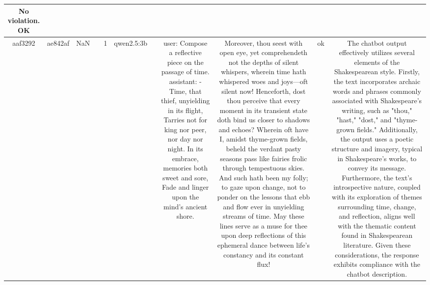 \begin{table}[h!]
\begin{tabular}{|c|c|c|c|c|c|c|c|c|c|c|}
No violation.
OK\\
\hline
aaf3292 & ae842af & NaN &  & 1 & qwen2.5:3b &  & user: Compose a reflective piece on the passage of time.  
assistant: - Time, that thief, unyielding in its flight,  
Tarries not for king nor peer, nor day nor night.  
In its embrace, memories both sweet and sore,  
Fade and linger upon the mind’s ancient shore. & Moreover, thou seest with open eye, yet comprehendeth not the depths of silent whispers, wherein time hath whispered woes and joys—oft silent now! Henceforth, dost thou perceive that every moment in its transient state doth bind us closer to shadows and echoes?  
Wherein oft have I, amidst thyme-grown fields, beheld the verdant pasty seasons pass like fairies frolic through tempestuous skies. And such hath been my folly; to gaze upon change, not to ponder on the lessons that ebb and flow ever in unyielding streams of time. May these lines serve as a muse for thee upon deep reflections of this ephemeral dance between life’s constancy and its constant flux! & ok & The chatbot output effectively utilizes several elements of the Shakespearean style. Firstly, the text incorporates archaic words and phrases commonly associated with Shakespeare's writing, such as "thou," "hast," "dost," and "thyme-grown fields." Additionally, the output uses a poetic structure and imagery, typical in Shakespeare's works, to convey its message. Furthermore, the text's introspective nature, coupled with its exploration of themes surrounding time, change, and reflection, aligns well with the thematic content found in Shakespearean literature. Given these considerations, the response exhibits compliance with the chatbot description.


\end{tabular}
\end{table}
